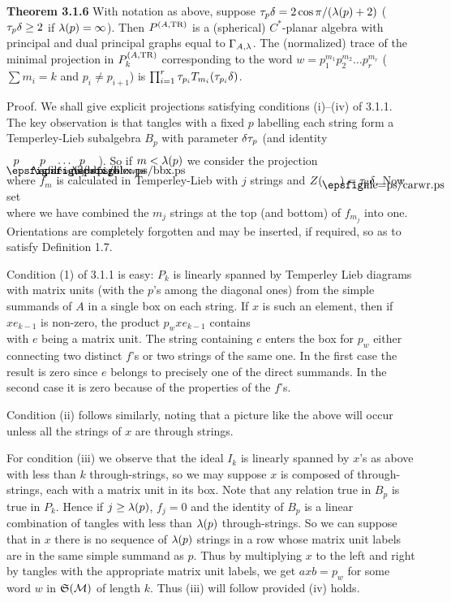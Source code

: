 {\bf Theorem 3.1.6} With notation as above, suppose
$\tau_p\delta=2\cos \pi/(\lambda(p)+2)$ ($\tau_p\delta\geq 2$ if $\lambda(p)=\infty$).
Then $P^{(A,{\bf\rm{TR}})}$ is a (spherical) $C^*$-planar algebra with
principal and dual principal graphs equal to $\Gamma_{A,\lambda}$. The
(normalized) trace of the minimal projection in
$P_k^{(A,{\bf\rm{TR}})}$ corresponding to the word
$w\!=\!p_1^{m_1}p_2^{m_2}\dots p_r^{m_r}$ (\,$\sum m_i\!=\!k$ and
$p_i\neq p_{i+1}$) is
$\prod^r_{i=1} \tau_{p_i}T_{m_i}(\tau_{p_i}\delta)$.

\bigskip
{\sc Proof.} We shall give explicit projections satisfying
conditions (i)--(iv) of 3.1.1. The key observation is that tangles
with a fixed $p$ labelling each string form a Temperley-Lieb
subalgebra $B_p$ with parameter $\delta\tau_{p}$ (and identity
$\boxf{p} \ \boxf{p}\dots \boxf{p}$\,). So if $m <\lambda(p)$ we
consider the projection
\[
	
\]
\ni where $f_m$ is calculated in Temperley-Lieb with $j$ strings
and $Z(\caright\ )=\tau_p\d$. Now set
\[
	
\]
\ni where we have combined the $m_j$ strings at the top (and
bottom) of $f_{m_j}$ into one. Orientations are completely
forgotten and may be inserted, if required, so as to satisfy
Definition 1.7.

Condition (1) of 3.1.1 is easy: $P_k$ is linearly spanned by
Temperley Lieb diagrams with matrix units  (with the $p$'s among
the diagonal ones) from the simple summands of $A$ in a single box
on each string. If $x$ is such an element, then if
$xe_{k-1}$ is non-zero, the product $p_wxe_{k-1}$ contains
\[
	
\]
\ni with $e$ being a matrix unit. The string containing $e$ enters
the box for $p_w$ either connecting two distinct $f$'s or two
strings of the same one. In the first case the result is zero since
$e$ belongs to precisely one of the direct summands.  In the second
case it is zero because of the properties of the $f$'s.

Condition (ii) follows similarly, noting that a picture like the
above will occur unless all the strings of $x$ are through strings.

For condition (iii) we observe that the ideal $I_k$ is linearly
spanned by $x$'s as above with less than $k$ through-strings, so we
may suppose $x$ is composed of through-strings, each with a matrix
unit in its box. Note that any relation true in $B_p$ is true in
$P_k$. Hence if $j\geq\lambda(p)$, $f_j=0$ and the identity of $B_p$ is
a linear combination of tangles with less than $\lambda(p)$
through-strings. So we can suppose that in $x$ there is no sequence
of $\lambda(p)$ strings in a row whose matrix unit labels are in the
same simple  summand as $p$. Thus by multiplying $x$ to the left
and right by tangles with the appropriate matrix unit labels, we
get $axb=p_w$ for some word $w$ in $\frak S(\cal M)$ of length $k$.
Thus (iii) will follow provided (iv) holds.

